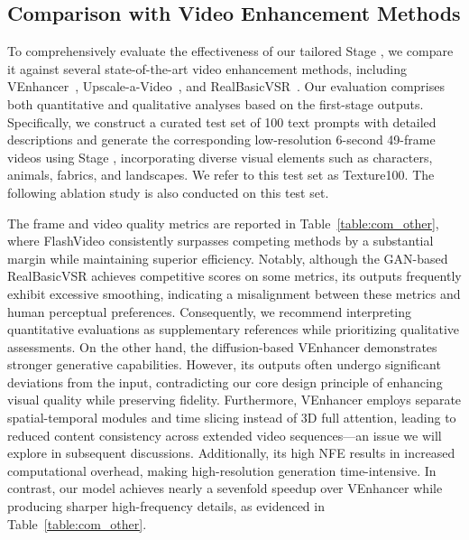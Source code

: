 \subsection{Comparison with Video Enhancement Methods}




To comprehensively evaluate the effectiveness of our tailored Stage , we compare it against several state-of-the-art video enhancement methods, including VEnhancer~\citep{venhancer}, Upscale-a-Video~\citep{upscaleavideo}, and RealBasicVSR~\citep{RealBasicVSR}. Our evaluation comprises both quantitative and qualitative analyses based on the first-stage outputs. Specifically, we construct a curated test set of 100 text prompts with detailed descriptions and generate the corresponding low-resolution 6-second 49-frame videos using Stage , incorporating diverse visual elements such as characters, animals, fabrics, and landscapes. We refer to this test set as Texture100. The following ablation study is also conducted on this test set.

The frame and video quality metrics are reported in Table~\ref{table:com_other}, where FlashVideo consistently surpasses competing methods by a substantial margin while maintaining superior efficiency. Notably, although the GAN-based RealBasicVSR achieves competitive scores on some metrics, its outputs frequently exhibit excessive smoothing, indicating a misalignment between these metrics and human perceptual preferences. Consequently, we recommend interpreting quantitative evaluations as supplementary references while prioritizing qualitative assessments. On the other hand, the diffusion-based VEnhancer demonstrates stronger generative capabilities. However, its outputs often undergo significant deviations from the input, contradicting our core design principle of enhancing visual quality while preserving fidelity. Furthermore, VEnhancer employs separate spatial-temporal modules and time slicing instead of 3D full attention, leading to reduced content consistency across extended video sequences—an issue we will explore in subsequent discussions. Additionally, its high NFE results in increased computational overhead, making high-resolution generation time-intensive. In contrast, our model achieves nearly a sevenfold speedup over VEnhancer while producing sharper high-frequency details, as evidenced in Table~\ref{table:com_other}.

